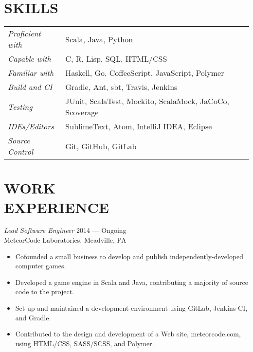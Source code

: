\documentclass[margin]{res}
\begin{document}
\begin{resume}
\section{SKILLS}
   \begin{tabular}{l p{3in}}
                \textit{Proficient with} & Scala, Java, Python \\
                \textit{Capable with} & C, R, Lisp, SQL, HTML/CSS \\
                \textit{Familiar with} & Haskell, Go, CoffeeScript, JavaScript, Polymer \\
   	            \textit{Build and CI}  & Gradle, Ant, sbt, Travis, Jenkins \\
                \textit{Testing}  & JUnit, ScalaTest, Mockito, ScalaMock, JaCoCo, Scoverage \\
                \textit{IDEs/Editors}  & SublimeText, Atom, IntelliJ IDEA, Eclipse \\
                \textit{Source Control} &Git, GitHub, GitLab
 \end{tabular}


\section{WORK \\ EXPERIENCE} 

                {\sl Lead Software Engineer} \hfill  2014 --- Ongoing \\
                MeteorCode Laboratories, Meadville, PA
                 \begin{itemize}  \itemsep -2pt %
                    \item Cofounded a small business to develop and publish independently-developed computer games. 
                    \item Developed a game engine in Scala and Java, contributing a majority of source code to the project.
                    \item Set up and maintained a development environment using GitLab, Jenkins CI, and Gradle.
		\item Contributed to the design and development of a Web site, meteorcode.com, using HTML/CSS, SASS/SCSS, and Polymer.
                 \end{itemize}
                
 

\end{resume}
\end{document}
